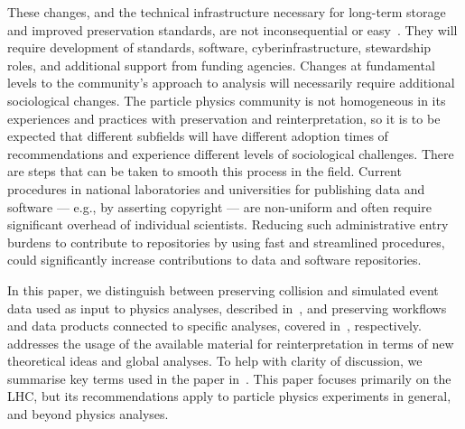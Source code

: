 \documentclass[11pt]{article}
\begin{document}
These changes, and the technical infrastructure necessary for long-term storage and improved preservation standards, are not inconsequential or easy~\cite{LHCReinterpretationForum:2020xtr,Cranmer:2021urp}.
They will require development of standards, software, cyberinfrastructure, stewardship roles, and additional support from funding agencies.
Changes at fundamental levels to the community's approach to analysis will necessarily require additional sociological changes.
The particle physics community is not homogeneous in its experiences and practices with preservation and reinterpretation, so it is to be expected that different subfields will have different adoption times of recommendations and experience different levels of sociological challenges.
There are steps that can be taken to smooth this process in the field.
%
Current procedures in national laboratories and universities for publishing data and software --- e.g., by asserting copyright --- are non-uniform and often require significant overhead of individual scientists.
Reducing such administrative entry burdens to contribute to repositories by using fast and streamlined procedures,
could significantly increase contributions to data and software repositories.

In this paper, we distinguish between preserving collision and simulated event data used as input to physics analyses, described in~, and preserving workflows and data products connected to specific analyses, covered in~, respectively.  addresses the usage of the available material for reinterpretation in terms of new theoretical ideas and global analyses.
To help with clarity of discussion, we summarise key terms used in the paper in~.
This paper focuses primarily on the \gls{LHC}, but its recommendations apply to particle physics experiments in general, and beyond physics analyses.
\end{document}
